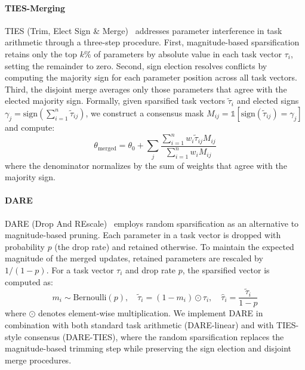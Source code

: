\documentclass{article}
\begin{document}
\paragraph{TIES-Merging}
TIES (Trim, Elect Sign \& Merge)~\citep{yadav2023tiesmergingresolvinginterferencemerging} addresses parameter interference in task arithmetic through a three-step procedure. First, magnitude-based sparsification retains only the top $k\%$ of parameters by absolute value in each task vector $\tau_i$, setting the remainder to zero. Second, sign election resolves conflicts by computing the majority sign for each parameter position across all task vectors. Third, the disjoint merge averages only those parameters that agree with the elected majority sign. Formally, given sparsified task vectors $\tilde{\tau}_i$ and elected signs $\gamma_j = \text{sign}\left(\sum_{i=1}^n \tilde{\tau}_{ij}\right)$, we construct a consensus mask $M_{ij} = \mathbb{1}[\text{sign}(\tilde{\tau}_{ij}) = \gamma_j]$ and compute:
\begin{equation}
\theta_{\text{merged}} = \theta_0 + \sum_{j} \frac{\sum_{i=1}^n w_i \tilde{\tau}_{ij} M_{ij}}{\sum_{i=1}^n w_i M_{ij}}
\end{equation}
where the denominator normalizes by the sum of weights that agree with the majority sign.

\paragraph{DARE}
DARE (Drop And REscale)~\citep{yu2024languagemodelssupermario} employs random sparsification as an alternative to magnitude-based pruning. Each parameter in a task vector is dropped with probability $p$ (the drop rate) and retained otherwise. To maintain the expected magnitude of the merged updates, retained parameters are rescaled by $1/(1-p)$. For a task vector $\tau_i$ and drop rate $p$, the sparsified vector is computed as:
\begin{equation}
m_i \sim \text{Bernoulli}(p), \quad \tilde{\tau}_i = (1 - m_i) \odot \tau_i, \quad \hat{\tau}_i = \frac{\tilde{\tau}_i}{1-p}
\end{equation}
where $\odot$ denotes element-wise multiplication. We implement DARE in combination with both standard task arithmetic (DARE-linear) and with TIES-style consensus (DARE-TIES), where the random sparsification replaces the magnitude-based trimming step while preserving the sign election and disjoint merge procedures.
\end{document}
